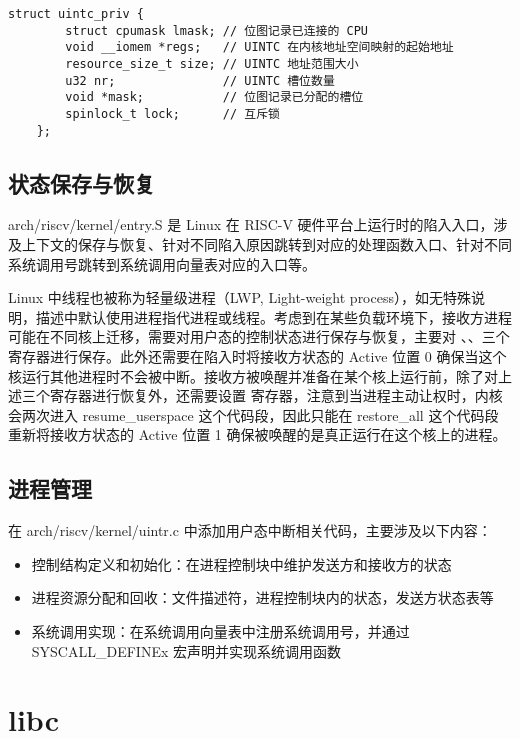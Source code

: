 \label{code:uintcpriv}
\begin{lstlisting}[style=CStyle]
    struct uintc_priv {
        struct cpumask lmask; // 位图记录已连接的 CPU
        void __iomem *regs;   // UINTC 在内核地址空间映射的起始地址
        resource_size_t size; // UINTC 地址范围大小
        u32 nr;               // UINTC 槽位数量
        void *mask;           // 位图记录已分配的槽位
        spinlock_t lock;      // 互斥锁
    };
\end{lstlisting}

\subsection{状态保存与恢复}

arch/riscv/kernel/entry.S 是 Linux 在 RISC-V 硬件平台上运行时的陷入入口，涉及上下文的保存与恢复、针对不同陷入原因跳转到对应的处理函数入口、针对不同系统调用号跳转到系统调用向量表对应的入口等。

Linux 中线程也被称为轻量级进程（LWP, Light-weight process）\cite{linuxbook}，如无特殊说明，描述中默认使用进程指代进程或线程。考虑到在某些负载环境下，接收方进程可能在不同核上迁移，需要对用户态的控制状态进行保存与恢复，主要对 \Rutvec 、\Ruscratch、\Ruepc 三个寄存器进行保存。此外还需要在陷入时将接收方状态的 Active 位置 0 确保当这个核运行其他进程时不会被中断。接收方被唤醒并准备在某个核上运行前，除了对上述三个寄存器进行恢复外，还需要设置 \Rsuirs 寄存器，注意到当进程主动让权时，内核会两次进入 resume\_userspace 这个代码段，因此只能在 restore\_all 这个代码段重新将接收方状态的 Active 位置 1 确保被唤醒的是真正运行在这个核上的进程。

\subsection{进程管理}

在 arch/riscv/kernel/uintr.c 中添加用户态中断相关代码，主要涉及以下内容：

\begin{itemize}
    \item 控制结构定义和初始化：在进程控制块中维护发送方和接收方的状态
    \item 进程资源分配和回收：文件描述符，进程控制块内的状态，发送方状态表等
    \item 系统调用实现：在系统调用向量表中注册系统调用号，并通过 SYSCALL\_DEFINEx 宏声明并实现系统调用函数
\end{itemize}

\section{libc}

